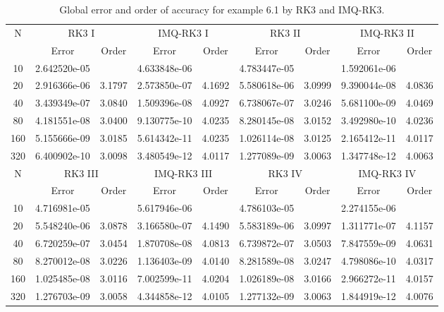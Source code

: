 \documentclass[a4paper, preprint,11pt]{elsarticle}
\numberwithin{equation}{section}
\begin{document}
\begin{table}[htbp!]
\centering
\caption{Global error and order of accuracy for example 6.1 by RK3 and IMQ-RK3.}
\begin{tabular}{c c c c c c c c c}
\toprule
 N & \multicolumn{2}{c}{RK3 I} & \multicolumn{2}{c}{IMQ-RK3 I} & \multicolumn{2}{c}{RK3 II} & \multicolumn{2}{c}{IMQ-RK3 II} \\
\cmidrule(lr){2-3} \cmidrule(lr){4-5} \cmidrule(lr){6-7}  \cmidrule(lr){8-9}
& Error & Order & Error & Order & Error & Order & Error & Order \\
\midrule
10  & 2.642520e-05 &       & 4.633848e-06 &       & 4.783447e-05 &       & 1.592061e-06 &       \\
20  & 2.916366e-06 & 3.1797 & 2.573850e-07 & 4.1692 & 5.580618e-06 & 3.0999 & 9.390044e-08 & 4.0836 \\
40  & 3.439349e-07 & 3.0840 & 1.509396e-08 & 4.0927 & 6.738067e-07 & 3.0246 & 5.681100e-09 & 4.0469 \\
80  & 4.181551e-08 & 3.0400 & 9.130775e-10 & 4.0235 & 8.280145e-08 & 3.0152 & 3.492980e-10 & 4.0236 \\
160 & 5.155666e-09 & 3.0185 & 5.614342e-11 & 4.0235 & 1.026114e-08 & 3.0125 & 2.165412e-11 & 4.0117 \\
320 & 6.400902e-10 & 3.0098 & 3.480549e-12 & 4.0117 & 1.277089e-09 & 3.0063 & 1.347748e-12 & 4.0063 \\
\midrule
N & \multicolumn{2}{c}{RK3 III} & \multicolumn{2}{c}{IMQ-RK3 III} & \multicolumn{2}{c}{RK3 IV} & \multicolumn{2}{c}{IMQ-RK3 IV} \\
\cmidrule(lr){2-3} \cmidrule(lr){4-5} \cmidrule(lr){6-7} \cmidrule(lr){8-9}
& Error & Order & Error & Order & Error & Order & Error & Order \\
\midrule
10  & 4.716981e-05 &       & 5.617946e-06 &       & 4.786103e-05 &       & 2.274155e-06 &       \\
20  & 5.548240e-06 & 3.0878 & 3.166580e-07 & 4.1490 & 5.583189e-06 & 3.0997 & 1.311771e-07 & 4.1157 \\
40  & 6.720259e-07 & 3.0454 & 1.870708e-08 & 4.0813 & 6.739872e-07 & 3.0503 & 7.847559e-09 & 4.0631 \\
80  & 8.270012e-08 & 3.0226 & 1.136403e-09 & 4.0140 & 8.281589e-08 & 3.0247 & 4.798086e-10 & 4.0317 \\
160 & 1.025485e-08 & 3.0116 & 7.002599e-11 & 4.0204 & 1.026189e-08 & 3.0166 & 2.966272e-11 & 4.0157 \\
320 & 1.276703e-09 & 3.0058 & 4.344858e-12 & 4.0105 & 1.277132e-09 & 3.0063 & 1.844919e-12 & 4.0076 \\
\bottomrule
\end{tabular}
\end{table}
\end{document}
